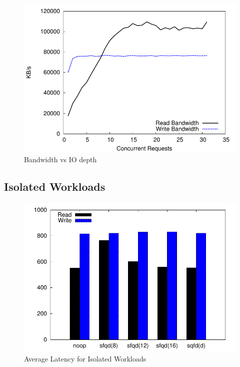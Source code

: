 \begin{figure}[t]
  \centering \includegraphics[width=\linewidth]{../../graphs/noop/bandwidth_motivation.pdf}
  \caption{Bandwidth vs IO depth}
  \label{fig:bandMot}
\end{figure}

\subsection{Isolated Workloads}

\begin{figure}[t]
  \centering \includegraphics[width=\linewidth]{../../graphs/solo/latency.pdf}
  \caption{Average Latency for Isolated Workloads}
  \label{fig:latSolo}
\end{figure} 

